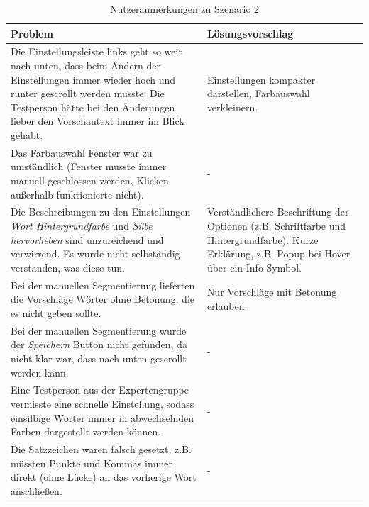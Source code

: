 \begin{table}[h!]
	\centering
	\begin{tabular}{|p{}|p{}|}
		\hline
		\textbf{Problem} & \textbf{Lösungsvorschlag}\\
		\hline
		\hline
		Die Einstellungsleiste links geht so weit nach unten, dass beim Ändern der Einstellungen immer wieder hoch und runter gescrollt werden musste. Die Testperson hätte bei den Änderungen lieber den Vorschautext immer im Blick gehabt. & Einstellungen kompakter darstellen, Farbauswahl verkleinern.\\
		\hline
		Das Farbauswahl Fenster war zu umständlich (Fenster musste immer manuell geschlossen werden, Klicken außerhalb funktionierte nicht). & -\\
		\hline
		Die Beschreibungen zu den Einstellungen \textit{Wort Hintergrundfarbe} und \textit{Silbe hervorheben} sind unzureichend und verwirrend. Es wurde nicht selbständig verstanden, was diese tun. & Verständlichere Beschriftung der Optionen (z.B. Schriftfarbe und Hintergrundfarbe). Kurze Erklärung, z.B. Popup bei Hover über ein Info-Symbol.\\
		\hline
		Bei der manuellen Segmentierung lieferten die Vorschläge Wörter ohne Betonung, die es nicht geben sollte. & Nur Vorschläge mit Betonung erlauben.\\
		\hline
		Bei der manuellen Segmentierung wurde der \textit{Speichern} Button nicht gefunden, da nicht klar war, dass nach unten gescrollt werden kann. & -\\
		\hline
		Eine Testperson aus der Expertengruppe vermisste eine schnelle Einstellung, sodass einsilbige Wörter immer in abwechselnden Farben dargestellt werden können. & -\\
		\hline
		Die Satzzeichen waren falsch gesetzt, z.B. müssten Punkte und Kommas immer direkt (ohne Lücke) an das vorherige Wort anschließen. & -\\
		\hline
	\end{tabular}
	\caption{Nutzeranmerkungen zu Szenario 2}
	\label{table:szenario2}
\end{table}
\newpage

